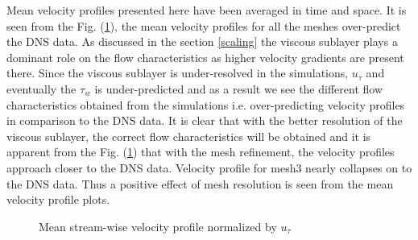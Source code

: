 Mean velocity profiles presented here have been averaged in time and space. It is seen from the Fig. (\ref{mean profile udns}), the mean velocity profiles for all the meshes over-predict the DNS data. As discussed in the section \ref{scaling} the viscous sublayer plays a dominant role on the flow characteristics as higher velocity gradients are present there. Since the viscous sublayer is under-resolved in the simulations, $u_\tau$ and eventually the $\tau_w$ is under-predicted and as a result we see the different flow characteristics obtained from the simulations i.e. over-predicting velocity profiles in comparison to the DNS data. It is clear that with the better resolution of the viscous sublayer, the correct flow characteristics will be obtained and it is apparent from the Fig. (\ref{mean profile udns}) that with the mesh refinement, the velocity profiles approach closer to the DNS data. Velocity profile for mesh3 nearly collapses on to the DNS data. Thus a positive effect of mesh resolution is seen from the mean velocity profile plots. 
%
%
\begin{figure}[h]
\begin{minipage}[b]{0.5\textwidth}
\end{minipage}
%
\begin{minipage}[b]{0.5\textwidth}
\end{minipage}
\caption{Mean stream-wise velocity profile normalized by $u_\tau$}
\label{mean profile udns}
\end{figure}
